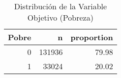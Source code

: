 \begin{table}[ht]
\centering
\begin{tabular}{rrr}
  \toprule
Pobre & n & proportion \\ 
  \midrule
  0 & 131936 & 79.98 \\ 
    1 & 33024 & 20.02 \\ 
   \bottomrule
\end{tabular}
\caption{Distribución de la Variable Objetivo (Pobreza)} 
\label{tab:poverty_distribution}
\end{table}
